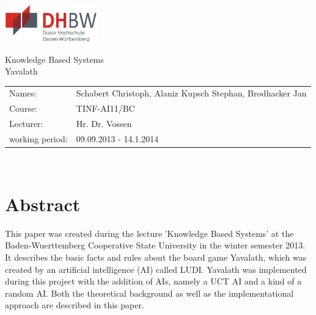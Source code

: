 \documentclass[english]{report} \usepackage[english]{babel}
\begin{document}
\pagestyle{fancy}
\lhead{}%

\lfoot{}%
\rfoot{\thepage}
\fancyhfoffset{\marginparsep}
\renewcommand{\footrulewidth}{1.0pt}
\renewcommand{\headrulewidth}{1.0pt}
\renewcommand{\headheight}{30pt}





\begin{titlepage}

\begin{flushright}
    \includegraphics*[width=4.0cm]{abbildungen/dhbwlogo} \\ 
\end{flushright}
\begin{center}
\vspace{1.5cm}
\Huge{ \textsf{Knowledge Based Systems}} \\
	Yavalath\\
    \vspace{4cm}
 \normalsize{
    \begin{tabular}{ll}
    	Names: & {Schabert Christoph,  Alaniz Kupsch Stephan,  Brodhacker Jan} \\
    	Course: & {TINF-AI11/BC}	\\
    	Lecturer: &  {Hr. Dr. Vossen}\\
    	working period: & {09.09.2013 - 14.1.2014}
    \end{tabular}\\
    }
\end{center}

\end{titlepage}

\newpage 
\section*{Abstract}\thispagestyle{empty}
This paper was created during the lecture 'Knowledge Based Systems' at the
Baden-Wuerttemberg Cooperative State University in the winter semester 2013. It
describes the basic facts and rules about the board game Yavalath, which was
created by an artificial intelligence (AI) called LUDI. Yavalath was implemented
during this project with the addition of AIs, namely a UCT AI and a kind of a
random AI. Both the theoretical background as well as the implementational
approach are described in this paper.
\end{document}
